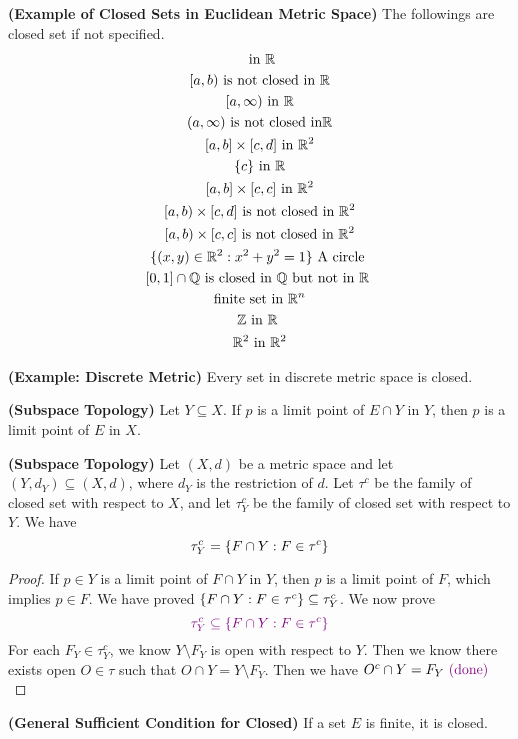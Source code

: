 \documentclass{report}
\begin{document}
\begin{theorem}
\label{2.4.7}
\textbf{(Example of Closed Sets in Euclidean Metric Space)} The followings are closed set if not specified.
\begin{gather}
[a,b]\text{ in }\R\\
[a,b)\text{ is not closed in }\R\\
  [a,\infty)\text{ in }\R\\
  (a,\infty)\text{ is not closed in}\R\\
  [a,b]\times [c,d]\text{ in }\R^2\\
  \set{c}\text{ in }\R\\
  [a,b]\times [c,c]\text{ in }\R^2\\
  [a,b)\times [c,d]\text{ is not closed in }\R^2\\
  [a,b)\times [c,c]\text{ is not closed in }\R^2\\
 \set{(x,y)\inr^2:x^2+y^2=1}\text{ A circle }\\
[0,1]\cap \Q \text{ is closed in $\Q$ but not in  $\R$ } \\
\text{ finite set in $\R^n$ } \\
\Z  \text{ in $\R$ }\\
\R^2 \text{ in  }\R^2
\end{gather}
\end{theorem}
\begin{theorem}
\label{2.4.8}
\textbf{(Example: Discrete Metric)} Every set in discrete metric space is closed.
\end{theorem}
\begin{theorem}
\label{2.4.9}
\textbf{(Subspace Topology)} Let $Y\subseteq X$. If $p$ is a limit point of $E\cap Y$ in $Y$, then $p$ is a limit point of  $E$ in $X$. 
\end{theorem}
\begin{corollary}
\label{2.4.10}
\textbf{(Subspace Topology)} Let $(X,d)$ be a metric space and let $(Y,d_Y)\subseteq (X,d)$, where $d_Y$ is the restriction of $d$. Let $\tau^c$ be the family of closed set with respect to $X$, and let $\tau^c_Y$ be the family of closed set with respect to $Y$. We have
\begin{equation}
\tau^c_Y=\{ F\cap Y:F\in \tau^c \}
\end{equation}
\end{corollary}
\begin{proof}
If $p\in Y$ is a limit point of $F\cap Y$ in $Y$, then  $p$ is a limit point of $F$, which implies  $p\in F$. We have proved $\{ F\cap Y:F\in \tau^c \}\subseteq \tau_Y^c$. We now prove
\begin{equation}
\textcolor{violet}{ \tau_Y^c\subseteq \{ F\cap Y:F\in \tau^c \}}
\end{equation}
For each $F_Y\in \tau_Y^c$, we know $Y\setminus F_Y$ is open with respect to $Y$. Then we know there exists open $O\in\tau$ such that $O\cap Y=Y\setminus F_Y$. Then we have $O^c \cap Y=F_Y\textcolor{violet}{\text{ (done) }}$
\end{proof}
\begin{theorem}
\label{2.4.11}
\textbf{(General Sufficient Condition for Closed)} If a set $E$ is finite, it is closed.
\end{theorem}
\end{document}
